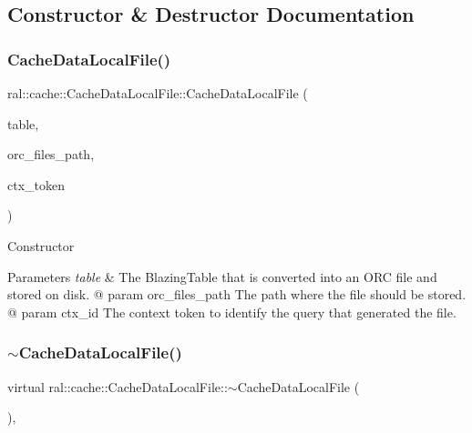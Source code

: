 \subsection{Constructor \& Destructor Documentation}
\mbox{\label{classral_1_1cache_1_1CacheDataLocalFile_aa8f42a81e963c076ebdf7bc6bc53a323}} 
\subsubsection{\texorpdfstring{Cache\+Data\+Local\+File()}{CacheDataLocalFile()}}
{\footnotesize\ttfamily ral\+::cache\+::\+Cache\+Data\+Local\+File\+::\+Cache\+Data\+Local\+File (\begin{DoxyParamCaption}\item[{std\+::unique\+\_\+ptr$<$ \hyperlink{classral_1_1frame_1_1BlazingTable}{ral\+::frame\+::\+Blazing\+Table} $>$}]{table,  }\item[{std\+::string}]{orc\+\_\+files\+\_\+path,  }\item[{std\+::string}]{ctx\+\_\+token }\end{DoxyParamCaption})}

Constructor 
\begin{DoxyParams}{Parameters}
{\em table} & The Blazing\+Table that is converted into an O\+RC file and stored on disk. @ param orc\+\_\+files\+\_\+path The path where the file should be stored. @ param ctx\+\_\+id The context token to identify the query that generated the file. \\
\hline
\end{DoxyParams}
\mbox{\label{classral_1_1cache_1_1CacheDataLocalFile_a47567f8650eae4b66e44df7e06f3def9}} 
\subsubsection{\texorpdfstring{$\sim$\+Cache\+Data\+Local\+File()}{~CacheDataLocalFile()}}
{\footnotesize\ttfamily virtual ral\+::cache\+::\+Cache\+Data\+Local\+File\+::$\sim$\+Cache\+Data\+Local\+File (\begin{DoxyParamCaption}{ }\end{DoxyParamCaption})\hspace{0.3cm}{\ttfamily [inline]}, {\ttfamily [virtual]}}

